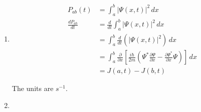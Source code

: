 \documentclass{article}
\begin{document}
\setcounter{subsection}{13}
\subsection{}

\begin{enumerate}
  \item

        \begin{align*}
          P_{a b}(t)            & = \int_a^b |\Psi(x, t)|^2 \,d x                                                                                                                                                  \\
          \frac{d P_{a b}}{d t} & = \frac{d}{d t} \int_a^b |\Psi(x, t)|^2 \,d x                                                                                                                                    \\
                                & = \int_a^b \frac{d}{d t} \left( |\Psi(x, t)|^2 \right) \,d x                                                                                                                     \\
                                & = \int_a^b \frac{\partial}{\partial x} \left[ \frac{i \hbar}{2 m} \left( \Psi^* \frac{\partial \Psi}{\partial x} - \frac{\partial \Psi^*}{\partial x} \Psi \right) \right] \,d x \\
                                & = J(a, t) - J(b, t)
        \end{align*}

        The units are $\unit{s^{-1}}$.

  \item


\end{enumerate}
\end{document}
